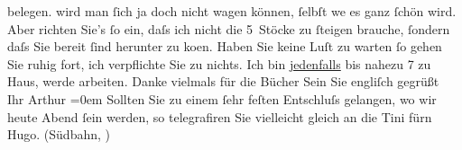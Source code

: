 \begin{ledgroupsized}[t]{13cm}
{{{                  belegen.}}}\label{K_L00549_1h} wird man ſich ja doch nicht {\pb}wagen
               können, ſelbſt we{\geminationn} es ganz ſchön wird. Aber richten
               Sie’s ſo ein, daſs ich nicht die 5 Stöcke zu ſteigen brauche, ſondern daſs Sie bereit
               ſind herunter zu ko{\geminationm}en. Haben Sie keine Luſt zu warten
               ſo gehen Sie ruhig fort, ich verpflichte Sie zu {\pb}nichts. Ich bin \uline{jedenfalls} bis nahezu 7 zu Haus,
               werde arbeiten.\pend
           \pstart
           Danke vielmals für die Bücher\pend
           \pstart
           Sein Sie engliſch gegrüßt{\\[\baselineskip]}Ihr \spacefill\mbox{Arthur}\pend
           \leftskip=0em{}\pstart
           Sollten Sie zu einem ſehr feſten Entschluſs gelangen, wo {\pb}wir heute Abend ſein werden, so telegrafiren Sie
               vielleicht gleich an die Tini fürn Hugo. (Südbahn,
                  \label{K_L00549_2v}\label{K_L00549_2h})\pend
           \endnumbering{}\end{ledgroupsized}  \newcommand{\dateiname}{L00549}\newcommand{\titel}{Arthur Schnitzler an Richard Beer-Hofmann, [4. 6. 1896?]}\newcommand{\editorInnen}{Martin Anton Müller und Gerd-Hermann Susen}
      